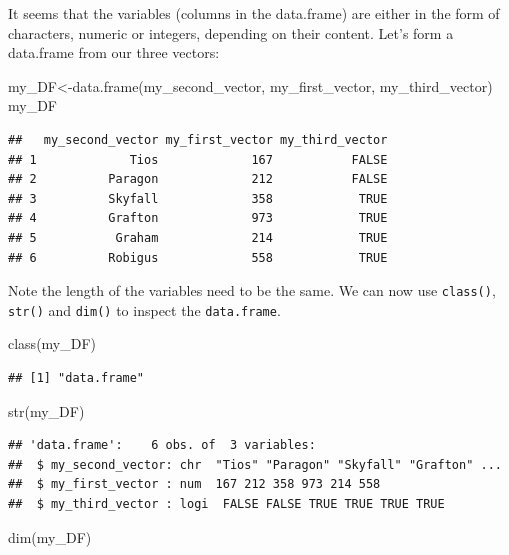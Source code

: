 \documentclass[
]{book}
\newenvironment{Shaded}{\begin{snugshade}}{\end{snugshade}}
\newcommand{\FunctionTok}[1]{\textcolor[rgb]{0.00,0.00,0.00}{#1}}
\newcommand{\NormalTok}[1]{#1}
\newcommand{\OtherTok}[1]{\textcolor[rgb]{0.56,0.35,0.01}{#1}}
\begin{document}
It seems that the variables (columns in the data.frame) are either in the form of characters, numeric or integers, depending on their content. Let's form a data.frame from our three vectors:

\begin{Shaded}
\begin{Highlighting}[]
\NormalTok{my\_DF}\OtherTok{\textless{}{-}}\FunctionTok{data.frame}\NormalTok{(my\_second\_vector, my\_first\_vector, my\_third\_vector)}
\NormalTok{my\_DF}
\end{Highlighting}
\end{Shaded}

\begin{verbatim}
##   my_second_vector my_first_vector my_third_vector
## 1             Tios             167           FALSE
## 2          Paragon             212           FALSE
## 3          Skyfall             358            TRUE
## 4          Grafton             973            TRUE
## 5           Graham             214            TRUE
## 6          Robigus             558            TRUE
\end{verbatim}

Note the length of the variables need to be the same. We can now use \texttt{class()}, \texttt{str()} and \texttt{dim()} to inspect the \texttt{data.frame}.

\begin{Shaded}
\begin{Highlighting}[]
\FunctionTok{class}\NormalTok{(my\_DF)}
\end{Highlighting}
\end{Shaded}

\begin{verbatim}
## [1] "data.frame"
\end{verbatim}

\begin{Shaded}
\begin{Highlighting}[]
\FunctionTok{str}\NormalTok{(my\_DF)}
\end{Highlighting}
\end{Shaded}

\begin{verbatim}
## 'data.frame':    6 obs. of  3 variables:
##  $ my_second_vector: chr  "Tios" "Paragon" "Skyfall" "Grafton" ...
##  $ my_first_vector : num  167 212 358 973 214 558
##  $ my_third_vector : logi  FALSE FALSE TRUE TRUE TRUE TRUE
\end{verbatim}

\begin{Shaded}
\begin{Highlighting}[]
\FunctionTok{dim}\NormalTok{(my\_DF)}
\end{Highlighting}
\end{Shaded}
\end{document}
